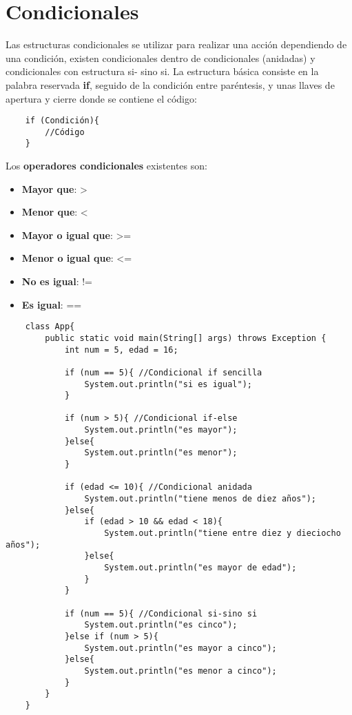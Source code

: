\section{Condicionales}
Las estructuras condicionales se utilizar para realizar una acción dependiendo de una condición, existen condicionales dentro de condicionales (anidadas) y condicionales con estructura si- sino si. La estructura básica consiste en la palabra reservada \textbf{if}, seguido de la condición entre paréntesis, y unas llaves de apertura y cierre donde se contiene el código:
\begin{lstlisting}
    if (Condición){
        //Código
    }
\end{lstlisting}
Los \textbf{operadores condicionales} existentes son:
\begin{itemize}
    \item \textbf{Mayor que}: >
    \item \textbf{Menor que}: <
    \item \textbf{Mayor o igual que}: >=
    \item \textbf{Menor o igual que}: <=
    \item \textbf{No es igual}: !=
    \item \textbf{Es igual}: ==
\end{itemize}
\begin{lstlisting}
    class App{
        public static void main(String[] args) throws Exception {
            int num = 5, edad = 16;
            
            if (num == 5){ //Condicional if sencilla
                System.out.println("si es igual");
            }
            
            if (num > 5){ //Condicional if-else
                System.out.println("es mayor");
            }else{
                System.out.println("es menor");
            }
            
            if (edad <= 10){ //Condicional anidada
                System.out.println("tiene menos de diez años");
            }else{
                if (edad > 10 && edad < 18){
                    System.out.println("tiene entre diez y dieciocho años");
                }else{
                    System.out.println("es mayor de edad");
                }
            }
            
            if (num == 5){ //Condicional si-sino si
                System.out.println("es cinco");
            }else if (num > 5){
                System.out.println("es mayor a cinco");
            }else{
                System.out.println("es menor a cinco");
            }
        }
    }
\end{lstlisting}



